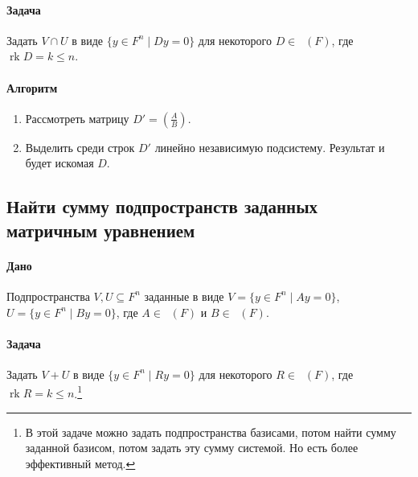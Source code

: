 \documentclass{article}
\newcommand{\MatrixDim}[3]{\mathop{\mathrm{M}_{#2\,#3}}(#1)}
\newcommand{\rk}{\operatorname{rk}}
\begin{document}
\paragraph{Задача}

Задать $V\cap U$ в виде $\{y\in F^{n}\mid D y = 0\}$ для некоторого $D\in\MatrixDim{F}{k}{n}$, где $\rk D = k\leqslant n$.

\paragraph{Алгоритм}
\begin{enumerate}
\item Рассмотреть матрицу $D' = \left(\frac{A}{B}\right)$.

\item Выделить среди строк $D'$ линейно независимую подсистему. Результат и будет искомая $D$.
\end{enumerate}


\subsection{Найти сумму подпространств заданных матричным уравнением}

\paragraph{Дано}

Подпространства $V,U\subseteq F^{n}$ заданные в виде $V = \{y\in F^{n}\mid Ay = 0\}$, $U = \{y\in F^{n}\mid By = 0\}$, где $A\in \MatrixDim{F}{m}{n}$ и $B\in \MatrixDim{F}{k}{n}$.

\paragraph{Задача}

Задать $V+U$ в виде $\{y\in F^{n}\mid Ry = 0\}$ для некоторого $R\in \MatrixDim{F}{k}{n}$, где $\rk R = k \leqslant n$.\footnote{В этой задаче можно задать подпространства базисами, потом найти сумму заданной базисом, потом задать эту сумму системой. Но есть более эффективный метод.}
\end{document}
